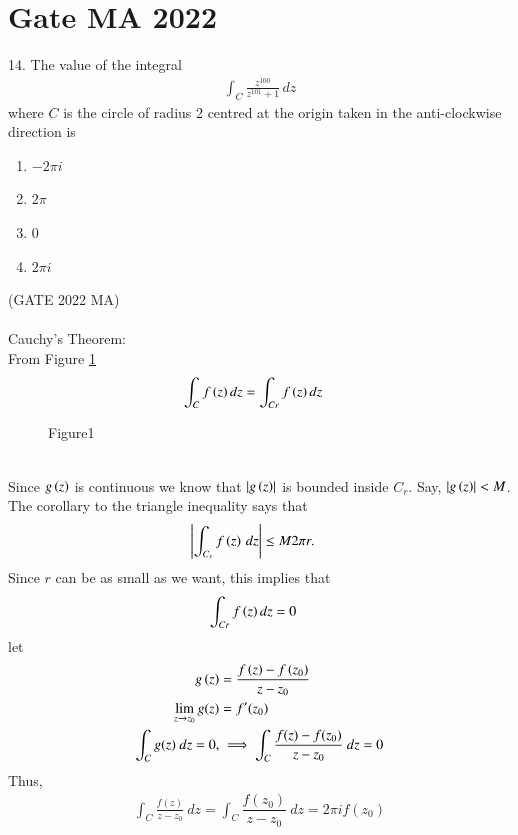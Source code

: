 \documentclass[journal,12pt,twocolumn]{IEEEtran}
\begin{document}


\vspace{3cm}

\title{}
\author{EE23BTECH11054 -  Sai Krishna Shanigarapu$^{*}$
}
\maketitle
\newpage
\bigskip

\section*{Gate MA 2022}
14. \hspace{2pt} The value of the integral 
\begin{align*}
    \int_C \frac{z^{100}}{z^{101}+1}\, dz
\end{align*}
where $C$ is the circle of radius 2 centred at the origin taken in the anti-clockwise direction is\\
\begin{enumerate}[label=(\Alph*)]
    \item $-2 \pi i$
    \item $2\pi$
    \item $0$
    \item $2\pi i $
\end{enumerate}
\hfill(GATE 2022 MA)\\
\solution\\

Cauchy's Theorem:\\
From Figure \ref{fig:fig1_gate_2022_ma_14}
\begin{align}
    \int_C f\left(z\right)dz &= \int_{Cr} f\left(z\right)dz
\end{align}
\begin{figure}[ht]
    \centering
    
    \caption{Figure1}
    \label{fig:fig1_gate_2022_ma_14}
\end{figure}\\
Since  $g\left(z\right)$ is continuous we know that $\left\vert g\left(z\right)\right\vert$ is bounded inside  $C_r$. Say,  $\left\vert g\left(z\right)\right\vert<M$. The corollary to the triangle inequality says that
\begin{align}
    \left\vert\int_{C_r}f\left(z\right)\, dz\right\vert &\leq M2\pi r.
\end{align}
Since  $r$ can be as small as we want, this implies that
\begin{align}
    \int_{Cr} f\left(z\right)dz &= 0
\end{align}
let \begin{align}
    g\left(z\right) &= \frac{f\left(z\right) - f\left(z_0\right)}{z-z_0}\\
    \lim_{z \to z_0} g(z) &= f'(z_0)\\
    \int_{C} g(z)\ dz = 0, &\implies \int_C \frac{f(z) - f(z_0)}{z - z_0} \ dz = 0
\end{align}
Thus,
\begin{align}
    \int_{C} \frac{f(z)}{z - z_0}\ dz = \int_C \dfrac{f(z_0)}{z - z_0}\ dz = 2\pi i f(z_0) \label{eq:eq3_gate_2022_ma_14}
\end{align}
\end{document}
